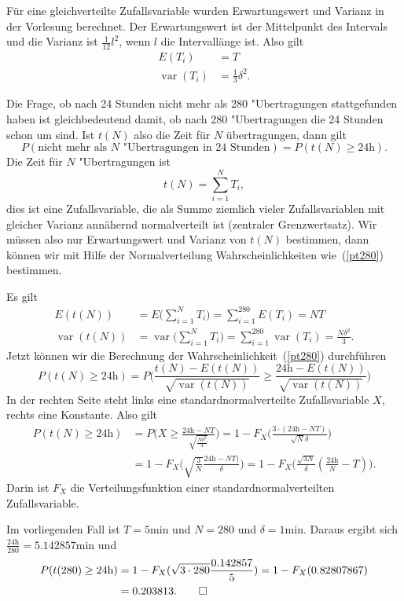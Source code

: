 \begin{loesung}
\begin{teilaufgaben}
\item Für eine gleichverteilte Zufallsvariable wurden Erwartungswert
und Varianz in der Vorlesung berechnet.
Der Erwartungswert ist der Mittelpunkt des Intervals und die
Varianz ist $\frac1{12}l^2$, wenn $l$ die Intervallänge ist.
Also gilt
\begin{align*}
E(T_i)&=T\\
\operatorname{var}(T_i)&=\frac13\delta^2.
\end{align*}
\item
Die Frage, ob nach 24 Stunden nicht mehr als 280 "Ubertragungen
stattgefunden haben ist gleichbedeutend damit, ob nach 280 "Ubertragungen
die 24 Stunden schon um sind. Ist $t(N)$ also die Zeit für $N$
übertragungen, dann gilt
\begin{equation}
P(\text{nicht mehr als $N$ "Ubertragungen in 24 Stunden})
=
P(t(N) \ge 24\text{h}).
\label{pt280}
\end{equation}
Die Zeit für $N$ "Ubertragungen ist
\[
t(N)=\sum_{i=1}^NT_i,
\]
dies ist eine Zufallsvariable, die als Summe ziemlich vieler
Zufallsvariablen mit gleicher Varianz annähernd normalverteilt ist
(zentraler Grenzwertsatz). Wir müssen also nur Erwartungswert und
Varianz von $t(N)$ bestimmen, dann können wir mit Hilfe der Normalverteilung
Wahrscheinlichkeiten wie~(\ref{pt280}) bestimmen.

Es gilt
\begin{align*}
E(t(N))
&=
E\biggl(\sum_{i=1}^{N}T_i\biggr)
= \sum_{i=1}^{280}E(T_i)=NT\\
\operatorname{var}(t(N))
&=
\operatorname{var}\biggl(\sum_{i=1}^{N}T_i\biggr)
= \sum_{i=1}^{280}\operatorname{var}(T_i)=\frac{N\delta^2}3.
\end{align*}
Jetzt können wir die Berechnung der Wahrscheinlichkeit~(\ref{pt280})
durchführen
\[
P(t(N)\ge \text{24h})=
P\biggl(
\frac{t(N)-E(t(N))}{\sqrt{\operatorname{var}(t(N))}}
\ge
\frac{\text{24h}-E(t(N))}{\sqrt{\operatorname{var}(t(N))}}
\biggr)
\]
In der rechten Seite steht links eine standardnormalverteilte
Zufallsvariable $X$, rechts eine Konstante. Also gilt
\begin{align*}
P(t(N)\ge \text{24h})
&
=
P\biggl(
X\ge
\frac{\text{24h}-NT}{\sqrt{\frac{N\delta^2}3}}
\biggr)
=1-F_X\biggl(
\frac{3\cdot(\text{24h}-NT)}{\sqrt{N}\delta}
\biggr)\\
&
=1-F_X\biggl(
\sqrt{\frac{3}{N}}
\frac{\text{24h}-NT)}{\delta}
\biggr)
=1-F_X\biggl(
\frac{\sqrt{3N}}{\delta}
\left(\frac{\text{24h}}{N}-T\right)
\biggr).
\end{align*}
Darin ist $F_X$ die Verteilungsfunktion einer standardnormalverteilten
Zufallsvariable.

Im vorliegenden Fall ist $T=\text{5min}$ und $N=280$ und $\delta=\text{1min}$.
Daraus ergibt sich $\frac{\text{24h}}{280}=5.142857\text{min}$ und
\begin{align*}
P(t(280)\ge \text{24h})
&=
1-F_X(
\sqrt{3\cdot 280}\frac{0.142857}{5}
)
=1-F_X(0.82807867)
\\
&
=0.203813.
\qedhere
\end{align*}
\end{teilaufgaben}
\end{loesung}

